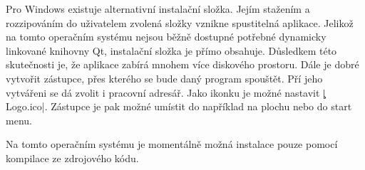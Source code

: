 Pro Windows existuje alternativní instalační složka. Jejím stažením a rozzipováním do uživatelem zvolená složky vznikne spustitelná aplikace. 
Jelikož na tomto operačním systému nejsou běžně dostupné potřebné dynamicky linkované knihovny Qt,
instalační složka je přímo obsahuje.
Důsledkem této skutečnosti je, že aplikace zabírá mnohem více diskového prostoru.
Dále je dobré vytvořit zástupce, přes kterého se bude daný program spouštět.
Pří jeho vytvářeni se dá zvolit i pracovní adresář.
Jako ikonku je možné nastavit \c|Logo.ico|.
Zástupce je pak možné umístit do například na plochu nebo do start menu.

Na tomto operačním systému je momentálně možná instalace pouze pomocí kompilace ze zdrojového kódu.
